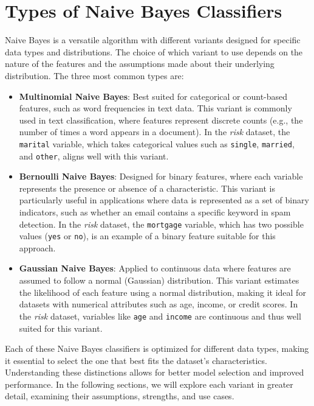 \documentclass[
  11pt,
]{book}
\theoremstyle{definition}
\theoremstyle{definition}
\theoremstyle{definition}
\theoremstyle{definition}
\theoremstyle{remark}
\begin{document}
\section{Types of Naive Bayes Classifiers}\label{types-of-naive-bayes-classifiers}

Naive Bayes is a versatile algorithm with different variants designed for specific data types and distributions. The choice of which variant to use depends on the nature of the features and the assumptions made about their underlying distribution. The three most common types are:

\begin{itemize}
\item
  \textbf{Multinomial Naive Bayes}: Best suited for categorical or count-based features, such as word frequencies in text data. This variant is commonly used in text classification, where features represent discrete counts (e.g., the number of times a word appears in a document). In the \emph{risk} dataset, the \texttt{marital} variable, which takes categorical values such as \texttt{single}, \texttt{married}, and \texttt{other}, aligns well with this variant.
\item
  \textbf{Bernoulli Naive Bayes}: Designed for binary features, where each variable represents the presence or absence of a characteristic. This variant is particularly useful in applications where data is represented as a set of binary indicators, such as whether an email contains a specific keyword in spam detection. In the \emph{risk} dataset, the \texttt{mortgage} variable, which has two possible values (\texttt{yes} or \texttt{no}), is an example of a binary feature suitable for this approach.
\item
  \textbf{Gaussian Naive Bayes}: Applied to continuous data where features are assumed to follow a normal (Gaussian) distribution. This variant estimates the likelihood of each feature using a normal distribution, making it ideal for datasets with numerical attributes such as age, income, or credit scores. In the \emph{risk} dataset, variables like \texttt{age} and \texttt{income} are continuous and thus well suited for this variant.
\end{itemize}

Each of these Naive Bayes classifiers is optimized for different data types, making it essential to select the one that best fits the dataset's characteristics. Understanding these distinctions allows for better model selection and improved performance. In the following sections, we will explore each variant in greater detail, examining their assumptions, strengths, and use cases.
\end{document}
